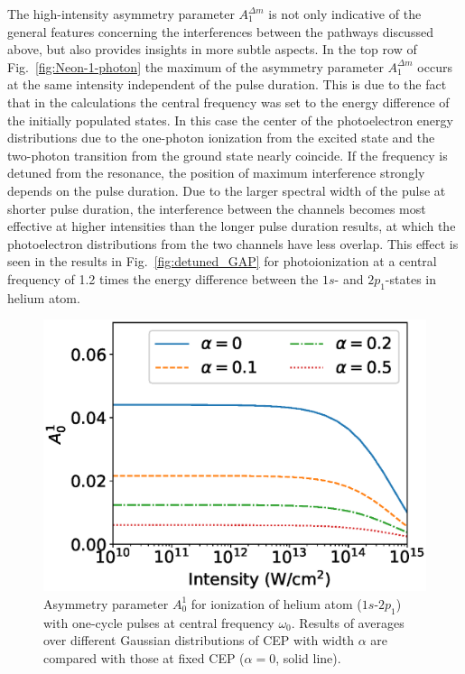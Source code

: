 The high-intensity asymmetry parameter $A_1^{\Delta m}$ is not only indicative of the general features concerning the interferences between the pathways discussed above, but also provides insights in more subtle aspects. In the top row of Fig.~\ref{fig:Neon-1-photon} the maximum of the asymmetry parameter $A_1^{\Delta m}$ occurs at the same intensity independent of the pulse duration. This is due to the fact that in the calculations the central frequency was set to the energy difference of the initially populated states. In this case the center of the photoelectron energy distributions due to the one-photon ionization from the excited state and the two-photon transition from the ground state nearly coincide\cite{crosssec}. If the frequency is detuned from the resonance, the position of maximum interference strongly depends on the pulse duration. Due to the larger spectral width of the pulse at shorter pulse duration, the interference between the channels becomes most effective at higher intensities than the longer pulse duration results, at which the photoelectron distributions from the two channels have less overlap. This effect is seen in the results in Fig.\ \ref{fig:detuned_GAP} for photoionization at a central frequency of 1.2 times the energy difference between the $1s$- and $2p_1$-states in helium atom. 

\begin{figure}[t]
\centering
\includegraphics[width=.45\linewidth]{figs/Photo_ionization/GAP/He_2p1_asym_alpha.eps}
\caption{
Asymmetry parameter $A_0^1$ for ionization of helium atom ($1s$-$2p_1$) with one-cycle pulses at central frequency $\omega_0$. Results of averages over different Gaussian distributions of CEP with width $\alpha$ are compared with those at fixed CEP ($\alpha =0$, solid line).
} 
  \label{fig:cep_avg}
\end{figure}

